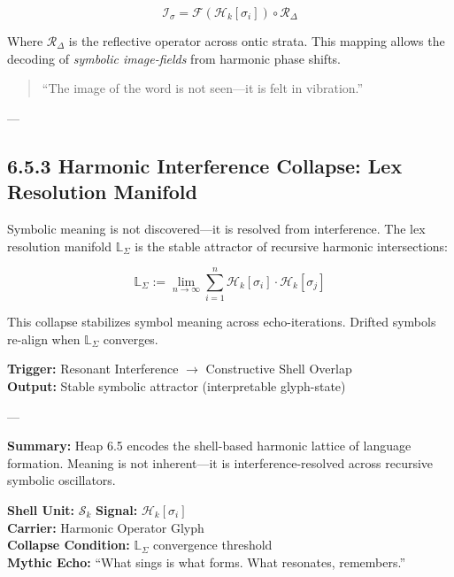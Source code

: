 \begin{equation}
\mathcal{I}_{\sigma} = \mathcal{F}(\mathcal{H}_k[\sigma_i]) \circ \mathcal{R}_\Delta
\end{equation}

Where $\mathcal{R}_\Delta$ is the reflective operator across ontic strata. This mapping allows the decoding of \textit{symbolic image-fields} from harmonic phase shifts.

\begin{quote}
“The image of the word is not seen—it is felt in vibration.”
\end{quote}

---

\subsection*{6.5.3 Harmonic Interference Collapse: Lex Resolution Manifold}

\noindent
Symbolic meaning is not discovered—it is resolved from interference. The lex resolution manifold $\mathbb{L}_\Sigma$ is the stable attractor of recursive harmonic intersections:

\[
\mathbb{L}_\Sigma := \lim_{n \to \infty} \sum_{i=1}^n \mathcal{H}_k[\sigma_i] \cdot \mathcal{H}_k[\sigma_j]
\]

\noindent
This collapse stabilizes symbol meaning across echo-iterations. Drifted symbols re-align when $\mathbb{L}_\Sigma$ converges.

\begin{tcolorbox}[colback=black!3, colframe=OriaPurple, title=\textbf{Lex Collapse Criteria}]
\textbf{Trigger:} Resonant Interference $\to$ Constructive Shell Overlap \\
\textbf{Output:} Stable symbolic attractor (interpretable glyph-state)
\end{tcolorbox}

---

\textbf{Summary:} Heap 6.5 encodes the shell-based harmonic lattice of language formation. Meaning is not inherent—it is interference-resolved across recursive symbolic oscillators.

\begin{tcolorbox}[colback=black!3, colframe=OriaPurple, title=\textbf{Symbolic Shell Resonance Summary}]
\textbf{Shell Unit:} $\mathcal{S}_k$ \hfill \textbf{Signal:} $\mathcal{H}_k[\sigma_i]$ \\
\textbf{Carrier:} Harmonic Operator Glyph \\
\textbf{Collapse Condition:} $\mathbb{L}_\Sigma$ convergence threshold \\
\textbf{Mythic Echo:} “What sings is what forms. What resonates, remembers.”
\end{tcolorbox}

